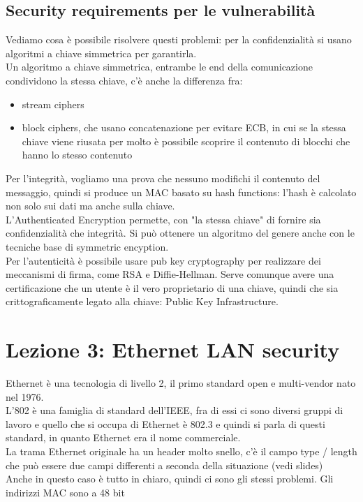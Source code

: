 \documentclass[12pt, oneside]{extbook} %
\begin{document}
\subsection{Security requirements per le vulnerabilità}
Vediamo cosa è possibile risolvere questi problemi: per la confidenzialità si usano algoritmi a chiave simmetrica per garantirla.\\ Un algoritmo a chiave simmetrica, entrambe le end della comunicazione condividono la stessa chiave, c'è anche la differenza fra:
\begin{itemize}
\item stream ciphers 
\item block ciphers, che usano concatenazione per evitare ECB, in cui se la stessa chiave viene riusata per molto è possibile scoprire il contenuto di blocchi che hanno lo stesso contenuto
\end{itemize}
Per l'integrità, vogliamo una prova che nessuno modifichi il contenuto del messaggio, quindi si produce un MAC basato su hash functions: l'hash è calcolato non solo sui dati ma anche sulla chiave.\\ L'Authenticated Encryption permette, con "la stessa chiave" di fornire sia confidenzialità che integrità. Si può ottenere un algoritmo del genere anche con le tecniche base di symmetric encyption.\\ Per l'autenticità è possibile usare pub key cryptography per realizzare dei meccanismi di firma, come RSA e Diffie-Hellman. Serve comunque avere una certificazione che un utente è il vero proprietario di una chiave, quindi che sia crittograficamente legato alla chiave: Public Key Infrastructure.
\section{Lezione 3: Ethernet LAN security}
Ethernet è una tecnologia di livello 2, il primo standard open e multi-vendor nato nel 1976.\\ L'802 è una famiglia di standard dell'IEEE, fra di essi ci sono diversi gruppi di lavoro e quello che si occupa di Ethernet è 802.3 e quindi si parla di questi standard, in quanto Ethernet era il nome commerciale.\\ La trama Ethernet originale ha un header molto snello, c'è il campo type / length che può essere due campi differenti a seconda della situazione (vedi slides)\\ Anche in questo caso è tutto in chiaro, quindi ci sono gli stessi problemi. Gli indirizzi MAC sono a 48 bit
\end{document}
